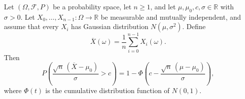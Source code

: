 \begin{theorem}
Let $(\Omega,\mathcal F,P)$ be a probability space, let $n\geq1$, and let
$\mu,\mu_0,c,\sigma\in\mathbb R$ with $\sigma>0$. Let
$X_0,\ldots,X_{n-1}:\Omega\to\mathbb R$ be measurable and mutually
independent, and assume that every $X_i$ has Gaussian distribution
$N(\mu,\sigma^2)$. Define
\[
 \overline X(\omega)=\frac1n\sum_{i=0}^{n-1}X_i(\omega).
\]
Then
\[
 P\!\left(
 \frac{\sqrt n\,(\overline X-\mu_0)}{\sigma}>c
 \right)
 =1-\Phi\!\left(c-\frac{\sqrt n\,(\mu-\mu_0)}{\sigma}\right),
\]
where $\Phi(t)$ is the cumulative distribution function of $N(0,1)$.
\end{theorem}
